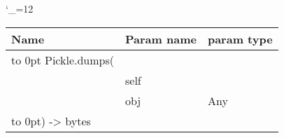 \begingroup \catcode`\_=12 \tt
\begin{tabular}{lll}
\toprule
\textrm{Name}&\textrm{Param name}&\textrm{param type}\\
\midrule
\hbox to 0pt {Pickle.dumps(\hss}\\
& self\\
& obj & Any\\
\hbox to 0pt{) -> bytes\hss}\\
\bottomrule
\end{tabular}
\endgroup
